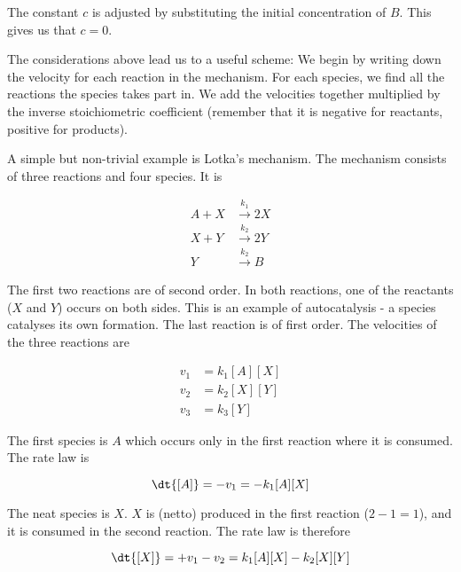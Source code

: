 The constant $c$ is adjusted by substituting the initial concentration of $B$. This gives us that $c = 0$.

The considerations above lead us to a useful scheme: We begin by writing down the velocity for each reaction in the mechanism. For each species, we find all the reactions the species takes part in. We add the velocities together multiplied by the inverse stoichiometric coefficient (remember that it is negative for reactants, positive for products).

\begin{example}
    A simple but non-trivial example is Lotka’s mechanism. The mechanism consists of three reactions and four species. It is

    \begin{align}
        A + X &\overset{k_1}{\rightarrow} 2X \\
        X + Y &\overset{k_2}{\rightarrow} 2Y \\
        Y     &\overset{k_2}{\rightarrow} B
    \end{align}

    The first two reactions are of second order. In both reactions, one of the reactants ($X$ and $Y$) occurs on both sides. This is an example of autocatalysis - a species catalyses its own formation. The last reaction is of first order. The velocities of the three reactions are

    \begin{subequations}
        \begin{align}
            v_1 &= k_1[A][X] \\
            v_2 &= k_2[X][Y] \\
            v_3 &= k_3[Y]
        \end{align}
    \end{subequations}

    The first species is $A$ which occurs only in the first reaction where it is consumed. The rate law is

    \begin{equation}
        \dt{[A]} = -v_1 = -k_1[A][X]
    \end{equation}

    The neat species is $X$. $X$ is (netto) produced in the first reaction ($2-1=1$), and it is consumed in the second reaction. The rate law is therefore

    \begin{equation}
        \dt{[X]} = +v_1 - v_2 = k_1[A][X] - k_2[X][Y]
    \end{equation}


\end{example}
